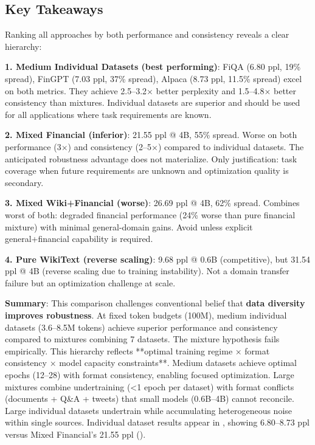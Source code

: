 

\subsection{Key Takeaways}

Ranking all approaches by both performance and consistency reveals a clear hierarchy:

\textbf{1. Medium Individual Datasets (best performing)}: FiQA (6.80 ppl, 19\% spread), FinGPT (7.03 ppl, 37\% spread), Alpaca (8.73 ppl, 11.5\% spread) excel on both metrics. They achieve 2.5–3.2$\times$ better perplexity and 1.5–4.8$\times$ better consistency than mixtures. Individual datasets are superior and should be used for all applications where task requirements are known.

\textbf{2. Mixed Financial (inferior)}: 21.55 ppl @ 4B, 55\% spread. Worse on both performance (3$\times$) and consistency (2–5$\times$) compared to individual datasets. The anticipated robustness advantage does not materialize. Only justification: task coverage when future requirements are unknown and optimization quality is secondary.

\textbf{3. Mixed Wiki+Financial (worse)}: 26.69 ppl @ 4B, 62\% spread. Combines worst of both: degraded financial performance (24\% worse than pure financial mixture) with minimal general-domain gains. Avoid unless explicit general+financial capability is required.

\textbf{4. Pure WikiText (reverse scaling)}: 9.68 ppl @ 0.6B (competitive), but 31.54 ppl @ 4B (reverse scaling due to training instability). Not a domain transfer failure but an optimization challenge at scale.

\textbf{Summary}: This comparison challenges conventional belief that \textbf{data diversity improves robustness}. At fixed token budgets (100M), medium individual datasets (3.6–8.5M tokens) achieve superior performance and consistency compared to mixtures combining 7 datasets. The mixture hypothesis fails empirically. This hierarchy reflects **optimal training regime × format consistency × model capacity constraints**. Medium datasets achieve optimal epochs (12–28) with format consistency, enabling focused optimization. Large mixtures combine undertraining (<1 epoch per dataset) with format conflicts (documents + Q\&A + tweets) that small models (0.6B–4B) cannot reconcile. Large individual datasets undertrain while accumulating heterogeneous noise within single sources. Individual dataset results appear in , showing 6.80–8.73 ppl versus Mixed Financial's 21.55 ppl ().

